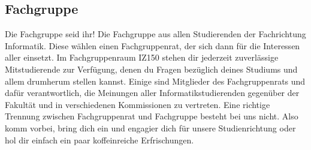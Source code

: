 \subsection{Fachgruppe}
	\label{fachgruppe}
	Die Fachgruppe seid ihr! Die Fachgruppe aus allen Studierenden der Fachrichtung Informatik. Diese wählen einen Fachgruppenrat, der sich dann für die Interessen aller einsetzt. 
	Im Fachgruppenraum IZ150 stehen dir jederzeit zuverlässige Mitstudierende zur Verfügung, denen du Fragen bezüglich deines Studiums und allem drumherum stellen kannst. Einige sind Mitglieder des Fachgruppenrats und dafür verantwortlich, die Meinungen aller Informatikstudierenden gegenüber der Fakultät und in verschiedenen Kommissionen zu vertreten. Eine richtige Trennung zwischen Fachgruppenrat und Fachgruppe besteht bei uns nicht. Also komm vorbei, bring dich ein und engagier dich für unsere Studienrichtung oder hol dir einfach ein paar koffeinreiche Erfrischungen. 
